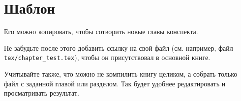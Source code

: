 \documentclass[../../main.tex]{subfiles}
\begin{document}
\section{Шаблон}

Его можно копировать, чтобы сотворить новые главы конспекта.

Не забудьте после этого добавить ссылку на свой файл
(см. например, файл \texttt{tex/chapter\_test.tex}), 
чтобы он присутствовал в основной книге.

Учитывайте также, что можно не компилить книгу целиком, а собрать только файл 
с заданной главой или разделом. Так будет удобнее редактировать 
и просматривать результат.
\end{document}
